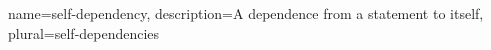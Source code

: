 



{
  name=self-dependency,
  description={A dependence from a statement to itself},
  plural=self-dependencies
}
